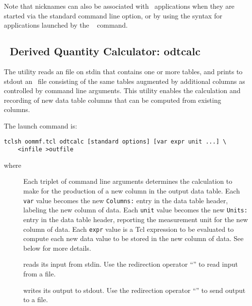 Note that nicknames can also be associated with \OOMMF\ applications
when they are started via the standard  command line
option, or by using the  syntax for
applications launched by the \MIF\  command.


\subsection{\ODT\ Derived Quantity Calculator: odtcalc}\label{sec:odtcalc}%

The  utility reads an
 file on stdin
that contains one or more tables, and prints to stdout an \ODT\ file
consisting of the same tables augmented by additional columns as
controlled by command line arguments.  This utility enables the calculation
and recording of new data table columns that can be computed from
existing columns.

The  launch command is:
\begin{verbatim}
tclsh oommf.tcl odtcalc [standard options] [var expr unit ...] \
    <infile >outfile
\end{verbatim}
where
\begin{description}
\item[]
  Each triplet of command line arguments determines the calculation
  to make for the production of a new column in the output data table.
  Each {\tt var} value becomes the new {\tt Columns:} entry in the
  data table header, labeling the new column of data.
  Each {\tt unit} value becomes the new {\tt Units:} entry in the
  data table header, reporting the measurement unit for the new
  column of data.
  Each {\tt expr} value is a Tcl expression to be evaluated to
  compute each new data value to be stored in the new column of data.
  See below for more details.
\item[]
   reads its input from stdin.  Use the redirection operator
  ``\boa'' to read input from a file.
\item[]
   writes its output to stdout.  Use the redirection operator
  ``\bca'' to send output to a file.
\end{description}

